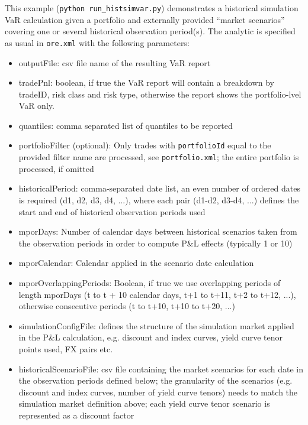 This example ({\tt python run\_histsimvar.py}) demonstrates a historical simulation VaR calculation
given a portfolio and externally provided ``market scenarios'' covering
one or several historical observation period(s).
The analytic is specified as usual in {\tt ore.xml} with the following parameters:
\begin{itemize}
\item outputFile: csv file name of the resulting VaR report 
\item tradePnl: boolean, if true the VaR report will contain a breakdown by tradeID, risk class and risk type, otherwise the report shows the portfolio-lvel VaR only.
\item quantiles: comma separated list of quantiles to be reported
\item portfolioFilter (optional): Only trades with {\tt portfolioId} equal to the provided filter name are processed, see {\tt portfolio.xml}; the entire portfolio is processed, if omitted
\item historicalPeriod: comma-separated date list, an even number of ordered dates is required (d1, d2, d3, d4, ...), where each pair (d1-d2, d3-d4, ...) defines the start and end of historical observation periods used
\item mporDays: Number of calendar days between historical scenarios taken from the observation periods in order to compute P\&L effects (typically 1 or 10) 
\item mporCalendar: Calendar applied in the scenario date calculation
\item mporOverlappingPeriods: Boolean, if true we use overlapping periods of length mporDays (t to t + 10 calendar days, t+1 to t+11, t+2 to t+12, ...), otherwise consecutive periods (t to t+10, t+10 to t+20, ...)
\item simulationConfigFile: defines the structure of the simulation market applied in the P\&L calculation, e.g. discount and index curves, yield curve tenor points used, FX pairs etc.
\item historicalScenarioFile: csv file containing the market scenarios for each date in the observation periods defined below; the granularity of the scenarios (e.g. discount and index curves, number of yield curve tenors) needs to match the simulation market definition above; each yield curve tenor scenario is represented as a discount factor 
\end{itemize}

